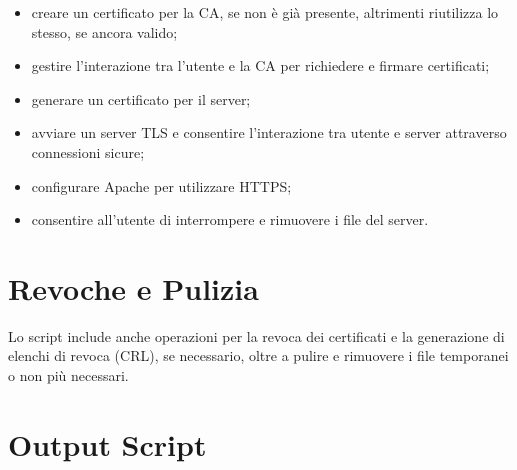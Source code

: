             \begin{itemize}
                \item creare un certificato per la CA, se non è già presente, altrimenti riutilizza lo stesso, se ancora valido;
                
                \item gestire l'interazione tra l'utente e la CA per richiedere e firmare certificati;
                
                \item generare un certificato per il server;
                
                \item avviare un server TLS e consentire l'interazione tra utente e server attraverso connessioni 
                sicure;
                
                \item configurare Apache per utilizzare HTTPS;
                
                \item consentire all'utente di interrompere e rimuovere i file del server.
            \end{itemize}

    \section{Revoche e Pulizia}
        Lo script include anche operazioni per la revoca dei certificati e la generazione di elenchi di revoca (CRL), se necessario, oltre a pulire e rimuovere i file temporanei o non più necessari.

    \section{Output Script}
        